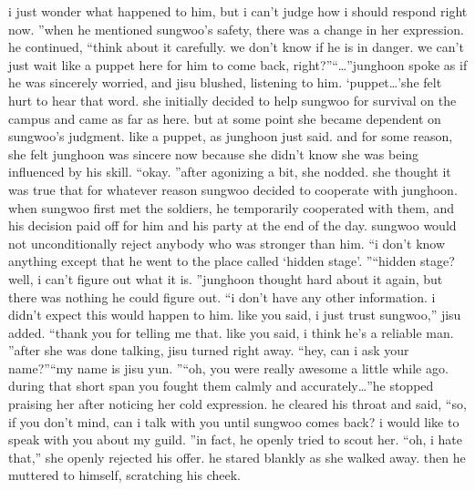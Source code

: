  i just wonder what happened to him, but i can’t judge how i should respond right now.
”when he mentioned sungwoo’s safety, there was a change in her expression.
he continued, “think about it carefully.
 we don’t know if he is in danger.
 we can’t just wait like a puppet here for him to come back, right?”“…”junghoon spoke as if he was sincerely worried, and jisu blushed, listening to him.
‘puppet…’she felt hurt to hear that word.
 she initially decided to help sungwoo for survival on the campus and came as far as here.
but at some point she became dependent on sungwoo’s judgment.
 like a puppet, as junghoon just said.
and for some reason, she felt junghoon was sincere now because she didn’t know she was being influenced by his skill.
“okay.
”after agonizing a bit, she nodded.
 she thought it was true that for whatever reason sungwoo decided to cooperate with junghoon.
when sungwoo first met the soldiers, he temporarily cooperated with them, and his decision paid off for him and his party at the end of the day.
 sungwoo would not unconditionally reject anybody who was stronger than him.
“i don’t know anything except that he went to the place called ‘hidden stage’.
”“hidden stage? well, i can’t figure out what it is.
”junghoon thought hard about it again, but there was nothing he could figure out.
“i don’t have any other information.
 i didn’t expect this would happen to him.
 like you said, i just trust sungwoo,” jisu added.
“thank you for telling me that.
 like you said, i think he’s a reliable man.
”after she was done talking, jisu turned right away.
“hey, can i ask your name?”“my name is jisu yun.
”“oh, you were really awesome a little while ago.
 during that short span you fought them calmly and accurately…”he stopped praising her after noticing her cold expression.
he cleared his throat and said, “so, if you don’t mind, can i talk with you until sungwoo comes back? i would like to speak with you about my guild.
”in fact, he openly tried to scout her.
“oh, i hate that,” she openly rejected his offer.
he stared blankly as she walked away.
then he muttered to himself, scratching his cheek.


